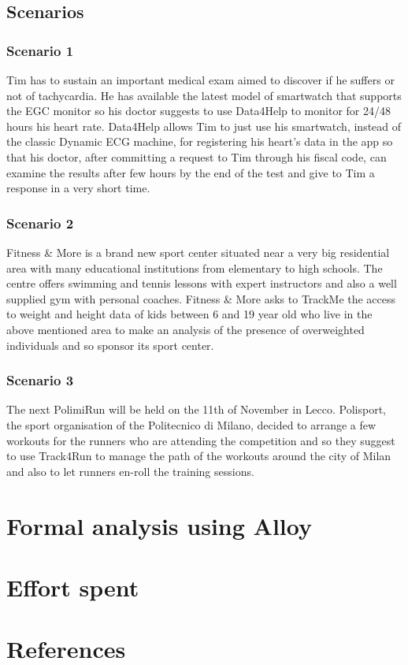 \documentclass{article}
\begin{document}
\subsection{Scenarios}

\subsubsection{Scenario 1}
Tim has to sustain an important medical exam aimed to discover if he
suffers or not of tachycardia. He has available the latest model of 
smartwatch that supports the EGC monitor so his doctor suggests to 
use Data4Help to monitor for 24/48 hours his heart rate. Data4Help 
allows Tim to just use his smartwatch, instead of the classic Dynamic 
ECG machine, for registering his heart’s data in the app so that his
doctor, after committing a request to Tim through his fiscal code, 
can examine the results after few hours by the end of the test and 
give to Tim a response in a very short time. 

\subsubsection{Scenario 2}
Fitness \& More is a brand new sport center situated near a very big 
residential area with many educational institutions from elementary to 
high schools. The centre offers swimming and tennis lessons with
expert instructors and also a well supplied gym with personal coaches.
Fitness \& More asks to TrackMe the access to weight and height data 
of kids between 6 and 19 year old who live in the above mentioned area 
to make an analysis of the presence of overweighted individuals and so
sponsor its sport center. 

\subsubsection{Scenario 3}
The next PolimiRun will be held on the 11th of November in Lecco.
Polisport, the sport organisation of the Politecnico di Milano, 
decided to arrange a few workouts for the runners who are attending 
the competition and so they suggest to use Track4Run to manage the 
path of the workouts around the city of Milan and also to let runners
en-roll the training sessions. 

\section{Formal analysis using Alloy}

\section{Effort spent}

\section{References}
\end{document}
